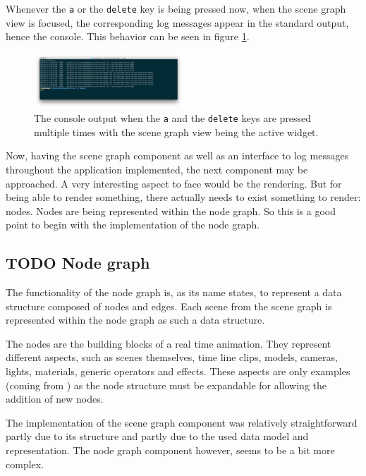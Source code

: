 \documentclass[10pt, openright, notitlepage]{scrreprt}
\begin{document}
Whenever the \texttt{a} or the \texttt{delete} key is being pressed now, when the scene graph
view is focused, the corresponding log messages appear in the standard output,
hence the console. This behavior can be seen in figure \ref{fig:editor-alpha-04}.

\begin{figure}[H]
\centering
\includegraphics[width=0.5\textwidth]{./images/qde_alpha_04.png}
\caption{\label{fig:editor-alpha-04}
The console output when the \texttt{a} and the \texttt{delete} keys are pressed multiple times with the scene graph view being the active widget.}
\end{figure}

Now, having the scene graph component as well as an interface to log messages
throughout the application implemented, the next component may be approached. A
very interesting aspect to face would be the rendering. But for being able to
render something, there actually needs to exist something to render: nodes.
Nodes are being represented within the node graph. So this is a good point to
begin with the implementation of the node graph.
\subsection{{\bfseries\sffamily TODO} Node graph}
\label{sec:org36c6f0f}
The functionality of the node graph is, as its name states, to represent a data
structure composed of nodes and edges. Each scene from the scene graph is
represented within the node graph as such a data structure.

The nodes are the building blocks of a real time animation. They represent
different aspects, such as scenes themselves, time line clips, models, cameras,
lights, materials, generic operators and effects. These aspects are only examples
(coming from \cite[p. 30 and 31]{osterwalder_qde_2016}) as the node structure
must be expandable for allowing the addition of new nodes.

The implementation of the scene graph component was relatively straightforward
partly due to its structure and partly due to the used data model and
representation. The node graph component however, seems to be a bit more complex.
\end{document}
